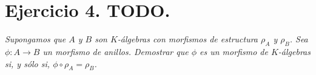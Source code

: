 \section{Ejercicio 4. TODO.} \emph{Supongamos que \(A\) y \(B\) son
  \(K\)-álgebras con
morfismos de estructura \(\rho_A\) y \(\rho_B\). Sea \( \phi:A \to B\) un morfismo
de anillos. Demostrar que \(\phi\) es un morfismo de \(K\)-álgebras si, y sólo si,
\(\phi \circ \rho_A = \rho_B\).} \\
